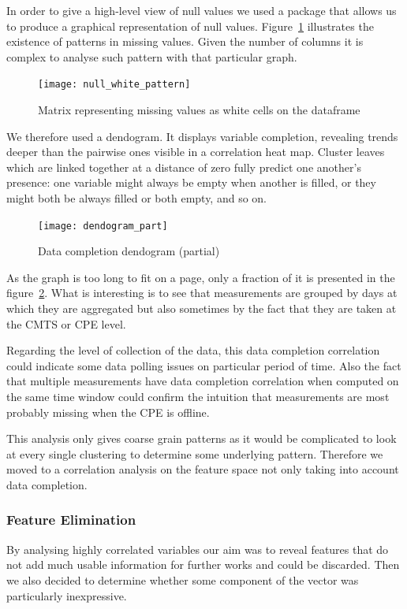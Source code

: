 In order to give a high-level view of null values we used a package that allows us to produce a graphical representation of null values. Figure~\ref{white_matrix} illustrates the existence of patterns in missing values. Given the number of columns it is complex to analyse such pattern with that particular graph. 


\begin{figure}[ht]
    \begin{center}
    \texttt{[image: null\_white\_pattern]}
    \end{center}
    \caption{Matrix representing missing values as white cells on the dataframe}
    \label{white_matrix}
\end{figure}

We therefore used a dendogram. It displays variable completion, revealing trends deeper than the pairwise ones visible in a correlation heat map. Cluster leaves which are linked together at a distance of zero fully predict one another's presence: one variable might always be empty when another is filled, or they might both be always filled or both empty, and so on.

\begin{figure}[ht]
    \begin{center}
    \texttt{[image: dendogram\_part]}
    \end{center}
    \caption{Data completion dendogram (partial)}
    \label{dendogram}
\end{figure}

As the graph is too long to fit on a page, only a fraction of it is presented in the figure~\ref{dendogram}. What is interesting is to see that measurements are grouped by days at which they are aggregated but also sometimes by the fact that they are taken at the CMTS or CPE level. 

Regarding the level of collection of the data, this data completion correlation could indicate some data polling issues on particular period of time. Also the fact that multiple measurements have data completion correlation when computed on the same time window could confirm the intuition that measurements are most probably missing when the CPE is offline. 

This analysis only gives coarse grain patterns as it would be complicated to look at every single clustering to determine some underlying pattern. Therefore we moved to a correlation analysis on the feature space not only taking into account data completion. 

\subsubsection{Feature Elimination}
By analysing highly correlated variables our aim was to reveal features that do not add much usable information for further works and could be discarded. Then we also decided to determine whether some component of the vector was particularly inexpressive. 
 
